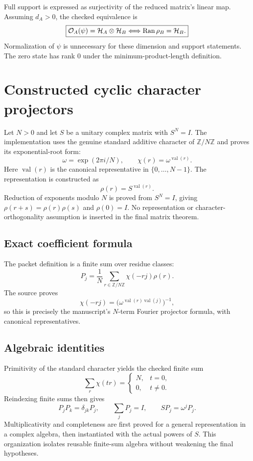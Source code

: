 Full support is expressed as surjectivity of the reduced matrix's linear map. Assuming $d_A>0$, the checked equivalence is
\[
\boxed{\mathcal O_A(\psi)=\mathcal H_A\otimes\mathcal H_B
\quad\Longleftrightarrow\quad \Ran\rho_B=\mathcal H_B.}
\]
Normalization of $\psi$ is unnecessary for these dimension and support statements. The zero state has rank $0$ under the minimum-product-length definition.





\section{Constructed cyclic character projectors}\label{supp3:section:003}
Let $N>0$ and let $S$ be a unitary complex matrix with $S^N=I$. The implementation uses the genuine standard additive character of $\mathbb Z/N\mathbb Z$ and proves its exponential-root form:
\[
\omega=\exp(2\pi i/N),\qquad
\chi(r)=\omega^{\operatorname{val}(r)}.
\]
Here $\operatorname{val}(r)$ is the canonical representative in $\{0,\ldots,N-1\}$. The representation is constructed as
\[
\rho(r)=S^{\operatorname{val}(r)}.
\]
Reduction of exponents modulo $N$ is proved from $S^N=I$, giving $\rho(r+s)=\rho(r)\rho(s)$ and $\rho(0)=I$. No representation or character-orthogonality assumption is inserted in the final matrix theorem.

\subsection{Exact coefficient formula}
The packet definition is a finite sum over residue classes:
\[
P_j=\frac1N\sum_{r\in\mathbb Z/N\mathbb Z}\chi(-rj)\rho(r).
\]
The source proves
\[
\chi(-rj)=\bigl(\omega^{\operatorname{val}(r)\operatorname{val}(j)}\bigr)^{-1},
\]
so this is precisely the manuscript's $N$-term Fourier projector formula, with canonical representatives.

\subsection{Algebraic identities}
Primitivity of the standard character yields the checked finite sum
\[
\sum_r\chi(tr)=\begin{cases}N,&t=0,\\0,&t\ne0.\end{cases}
\]
Reindexing finite sums then gives
\[
\boxed{P_jP_k=\delta_{jk}P_j,\qquad \sum_jP_j=I,\qquad SP_j=\omega^jP_j.}
\]
Multiplicativity and completeness are first proved for a general representation in a complex algebra, then instantiated with the actual powers of $S$. This organization isolates reusable finite-sum algebra without weakening the final hypotheses.

